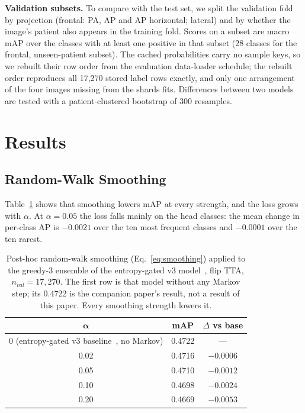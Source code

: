 \documentclass[conference]{IEEEtran}
\begin{document}
\textbf{Validation subsets.} To compare with the test set, we split the validation fold by projection (frontal: PA, AP and AP horizontal; lateral) and by whether the image's patient also appears in the training fold. Scores on a subset are macro mAP over the classes with at least one positive in that subset (28 classes for the frontal, unseen-patient subset). The cached probabilities carry no sample keys, so we rebuilt their row order from the evaluation data-loader schedule; the rebuilt order reproduces all 17,270 stored label rows exactly, and only one arrangement of the four images missing from the shards fits. Differences between two models are tested with a patient-clustered bootstrap of 300 resamples.

\section{Results}

\subsection{Random-Walk Smoothing}
Table~\ref{tab:smoothing} shows that smoothing lowers mAP at every strength, and the loss grows with $\alpha$. At $\alpha = 0.05$ the loss falls mainly on the head classes: the mean change in per-class AP is $-0.0021$ over the ten most frequent classes and $-0.0001$ over the ten rarest.

\begin{table}[htbp]
\caption{Post-hoc random-walk smoothing (Eq.~\eqref{eq:smoothing}) applied to the greedy-3 ensemble of the entropy-gated v3 model~\cite{b25}, flip TTA, $n_{val} = 17{,}270$. The first row is that model without any Markov step; its 0.4722 is the companion paper's result, not a result of this paper. Every smoothing strength lowers it.}
\begin{center}
\begin{tabular}{|c|c|c|}
\hline
$\boldsymbol{\alpha}$ & \textbf{mAP} & \textbf{$\Delta$ vs base} \\
\hline
0 (entropy-gated v3 baseline~\cite{b25}, no Markov) & 0.4722 & --- \\
\hline
0.02 & 0.4716 & $-0.0006$ \\
\hline
0.05 & 0.4710 & $-0.0012$ \\
\hline
0.10 & 0.4698 & $-0.0024$ \\
\hline
0.20 & 0.4669 & $-0.0053$ \\
\hline
\end{tabular}
\label{tab:smoothing}
\end{center}
\end{table}
\end{document}
